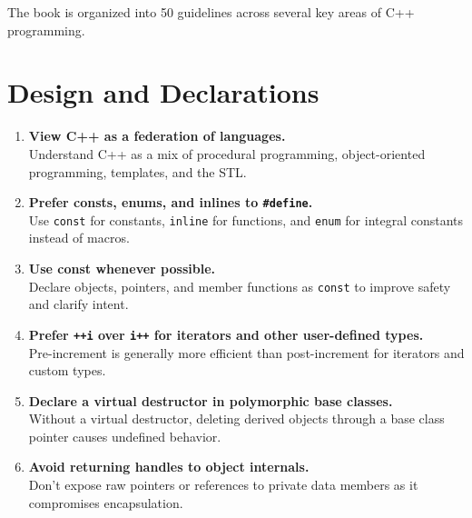 The book is organized into 50 guidelines across several key areas of C++ programming.

\section{Design and Declarations}
\begin{enumerate}
    \item \textbf{View C++ as a federation of languages.} \\
    Understand C++ as a mix of procedural programming, object-oriented programming, templates, and the STL.
    
    \item \textbf{Prefer consts, enums, and inlines to \texttt{\#define}.} \\
    Use \texttt{const} for constants, \texttt{inline} for functions, and \texttt{enum} for integral constants instead of macros.

    \item \textbf{Use const whenever possible.} \\
    Declare objects, pointers, and member functions as \texttt{const} to improve safety and clarify intent.

    \item \textbf{Prefer \texttt{++i} over \texttt{i++} for iterators and other user-defined types.} \\
    Pre-increment is generally more efficient than post-increment for iterators and custom types.

    \item \textbf{Declare a virtual destructor in polymorphic base classes.} \\
    Without a virtual destructor, deleting derived objects through a base class pointer causes undefined behavior.

    \item \textbf{Avoid returning handles to object internals.} \\
    Don't expose raw pointers or references to private data members as it compromises encapsulation.
\end{enumerate}

